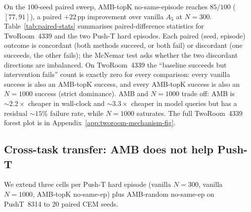 \documentclass{article}
\begin{document}
On the $100$-seed paired sweep, AMB-topK no-same-episode reaches $85/100$ ($[77, 91]$), a paired $+22$\,pp improvement over vanilla $A_5$ at $N{=}300$. Table~\ref{tab:paired-stats} summarises paired-difference statistics for TwoRoom~4339 and the two Push-T hard episodes. Each paired (seed, episode) outcome is concordant (both methods succeed, or both fail) or discordant (one succeeds, the other fails); the McNemar test asks whether the two discordant directions are imbalanced. On TwoRoom~4339 the ``baseline succeeds but intervention fails'' count is exactly zero for every comparison: every vanilla success is also an AMB-topK success, and every AMB-topK success is also an $N{=}1000$ success (strict dominance). AMB and $N{=}1000$ trade off: AMB is $\sim 2.2\times$ cheaper in wall-clock and $\sim 3.3\times$ cheaper in model queries but has a residual $\sim 15\%$ failure rate, while $N{=}1000$ saturates. The full TwoRoom~4339 forest plot is in Appendix~\ref{app:tworoom-mechanism-fig}.

\subsection{Cross-task transfer: AMB does not help Push-T}

We extend three cells per Push-T hard episode (vanilla $N{=}300$, vanilla $N{=}1000$, AMB-topK no-same-ep) plus AMB-random no-same-ep on PushT~8314 to $20$ paired CEM seeds.
\end{document}
